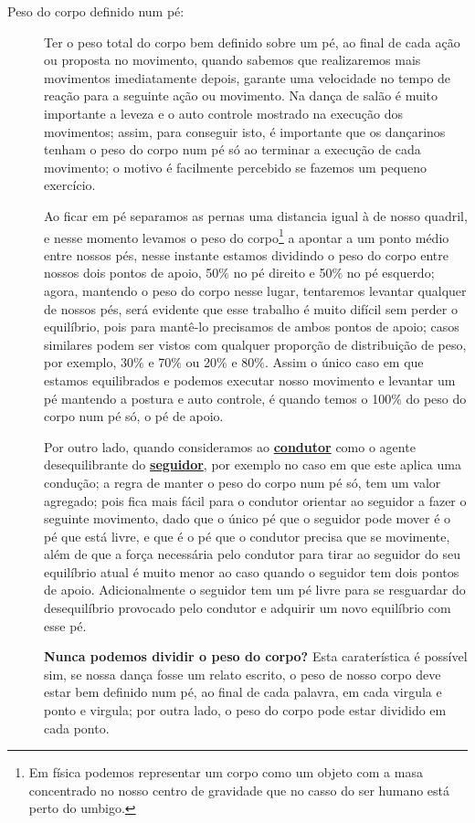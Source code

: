 \begin{description}
\item[Peso do corpo definido num pé:]
Ter o peso total do corpo bem definido sobre um pé, 
ao final de cada ação ou proposta no movimento,
quando sabemos que realizaremos mais movimentos imediatamente depois,
garante uma velocidade no tempo de reação para a seguinte ação ou movimento. 
Na dança de salão é muito importante a leveza e o auto controle mostrado na 
execução dos movimentos; assim, para conseguir isto, é importante que os dançarinos
tenham o peso do corpo num pé só ao terminar a execução de cada movimento; o motivo
é facilmente percebido se fazemos um pequeno exercício. 

Ao ficar em pé separamos as
pernas uma distancia igual à de nosso quadril, e nesse momento levamos o peso do corpo\footnote{
Em física podemos representar um corpo como um objeto com a masa concentrado no nosso centro de gravidade que no casso do ser humano está perto do umbigo.} a
apontar a um ponto médio entre nossos pés, nesse instante estamos dividindo o peso do corpo
entre nossos dois pontos de apoio, 50$\%$ no pé direito e 50$\%$ no pé esquerdo; agora, mantendo o peso
do corpo nesse lugar, tentaremos levantar qualquer de nossos pés, será evidente
que esse trabalho é muito difícil sem perder o equilíbrio, pois para mantê-lo
precisamos de ambos pontos de apoio; casos similares podem ser vistos com qualquer proporção de distribuição de peso,
por exemplo, 30$\%$ e 70$\%$ ou 20$\%$ e 80$\%$. Assim o único caso em que estamos
equilibrados e podemos executar nosso movimento e levantar um pé 
mantendo a postura e auto controle, é quando
temos o 100$\%$ do peso do corpo num pé só, o pé de apoio.
 
Por outro lado, quando consideramos ao \hyperref[def:Condutor]{\textbf{condutor}} como o agente desequilibrante do \hyperref[def:Seguidor]{\textbf{seguidor}}, por exemplo no caso
em que este aplica uma condução;
a regra de manter o peso do corpo num pé só, tem um valor agregado; 
pois fica mais fácil para o condutor orientar
ao seguidor a fazer o seguinte movimento, dado que o único pé que o seguidor pode mover é o pé
que está livre, e que é o pé que o condutor precisa que se movimente, 
além de que a força necessária pelo condutor para tirar ao seguidor do seu equilíbrio 
atual é muito menor ao caso quando o seguidor tem dois pontos de apoio.
Adicionalmente o seguidor tem um pé livre para se resguardar do desequilíbrio provocado pelo 
condutor e adquirir um novo equilíbrio com esse pé.

\textbf{Nunca podemos dividir o peso do corpo?} Esta caraterística é possível sim,
se nossa dança fosse um relato escrito, o peso de nosso corpo deve estar bem definido num pé,
ao final de cada palavra, em cada virgula e ponto e virgula; por outra lado, 
o peso do corpo pode estar dividido em cada ponto.


\end{description}
